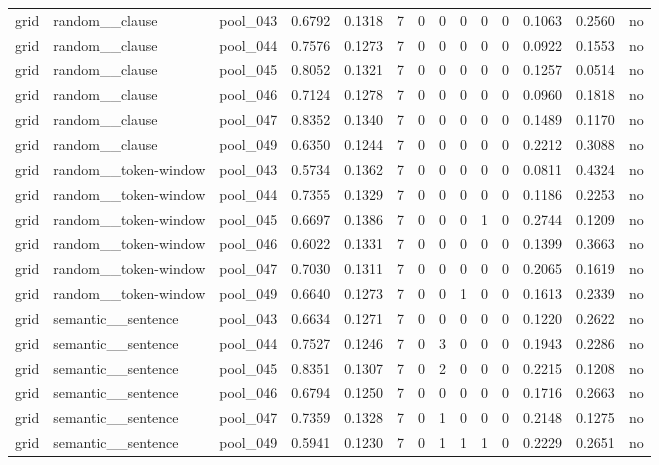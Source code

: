 \begin{table}[t]
{\begin{tabular}{llllllllllllll}
grid & random\_\_clause & pool\_043 & 0.6792 & 0.1318 & 7 & 0 & 0 & 0 & 0 & 0 & 0.1063 & 0.2560 & no \\
grid & random\_\_clause & pool\_044 & 0.7576 & 0.1273 & 7 & 0 & 0 & 0 & 0 & 0 & 0.0922 & 0.1553 & no \\
grid & random\_\_clause & pool\_045 & 0.8052 & 0.1321 & 7 & 0 & 0 & 0 & 0 & 0 & 0.1257 & 0.0514 & no \\
grid & random\_\_clause & pool\_046 & 0.7124 & 0.1278 & 7 & 0 & 0 & 0 & 0 & 0 & 0.0960 & 0.1818 & no \\
grid & random\_\_clause & pool\_047 & 0.8352 & 0.1340 & 7 & 0 & 0 & 0 & 0 & 0 & 0.1489 & 0.1170 & no \\
grid & random\_\_clause & pool\_049 & 0.6350 & 0.1244 & 7 & 0 & 0 & 0 & 0 & 0 & 0.2212 & 0.3088 & no \\
grid & random\_\_token-window & pool\_043 & 0.5734 & 0.1362 & 7 & 0 & 0 & 0 & 0 & 0 & 0.0811 & 0.4324 & no \\
grid & random\_\_token-window & pool\_044 & 0.7355 & 0.1329 & 7 & 0 & 0 & 0 & 0 & 0 & 0.1186 & 0.2253 & no \\
grid & random\_\_token-window & pool\_045 & 0.6697 & 0.1386 & 7 & 0 & 0 & 0 & 1 & 0 & 0.2744 & 0.1209 & no \\
grid & random\_\_token-window & pool\_046 & 0.6022 & 0.1331 & 7 & 0 & 0 & 0 & 0 & 0 & 0.1399 & 0.3663 & no \\
grid & random\_\_token-window & pool\_047 & 0.7030 & 0.1311 & 7 & 0 & 0 & 0 & 0 & 0 & 0.2065 & 0.1619 & no \\
grid & random\_\_token-window & pool\_049 & 0.6640 & 0.1273 & 7 & 0 & 0 & 1 & 0 & 0 & 0.1613 & 0.2339 & no \\
grid & semantic\_\_sentence & pool\_043 & 0.6634 & 0.1271 & 7 & 0 & 0 & 0 & 0 & 0 & 0.1220 & 0.2622 & no \\
grid & semantic\_\_sentence & pool\_044 & 0.7527 & 0.1246 & 7 & 0 & 3 & 0 & 0 & 0 & 0.1943 & 0.2286 & no \\
grid & semantic\_\_sentence & pool\_045 & 0.8351 & 0.1307 & 7 & 0 & 2 & 0 & 0 & 0 & 0.2215 & 0.1208 & no \\
grid & semantic\_\_sentence & pool\_046 & 0.6794 & 0.1250 & 7 & 0 & 0 & 0 & 0 & 0 & 0.1716 & 0.2663 & no \\
grid & semantic\_\_sentence & pool\_047 & 0.7359 & 0.1328 & 7 & 0 & 1 & 0 & 0 & 0 & 0.2148 & 0.1275 & no \\
grid & semantic\_\_sentence & pool\_049 & 0.5941 & 0.1230 & 7 & 0 & 1 & 1 & 1 & 0 & 0.2229 & 0.2651 & no \\

\end{tabular}}
\end{table}
